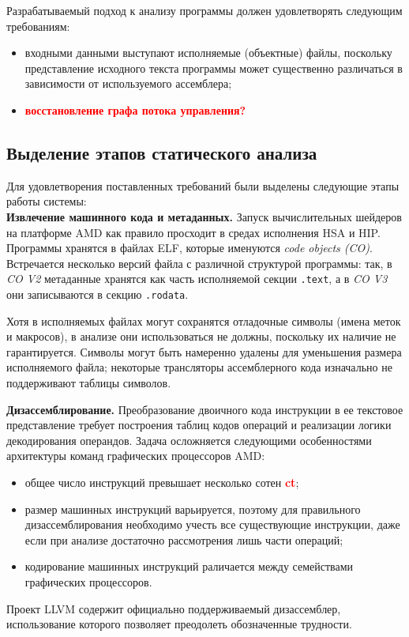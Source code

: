 \documentclass[a4paper,14pt]{extarticle}
\newcommand{\todo}[1]{\textbf{\textcolor{red}{#1}}}
\newcommand{\topic}[2]{\textbf{#1.} #2\newline}
\newenvironment{ul}{\begin{itemize}[noitemsep,topsep=0em]}{\end{itemize}\vspace{4mm}}
\begin{document}
Разрабатываемый подход к анализу программы должен удовлетворять следующим требованиям:

\begin{ul}
\item входными данными выступают исполняемые (объектные) файлы, поскольку представление исходного текста программы может существенно различаться в зависимости от используемого ассемблера;
\item \todo{восстановление графа потока управления?}
\end{ul}

\subsection{Выделение этапов статического анализа}

Для удовлетворения поставленных требований были выделены следующие этапы работы системы:\\

\topic{Извлечение машинного кода и метаданных}{Запуск вычислительных шейдеров на платформе AMD
как правило просходит в средах исполнения HSA и HIP. Программы хранятся в файлах ELF,
которые именуются \textit{code objects (CO)}.
Встречается несколько версий файла с различной структурой программы: так,
в \textit{CO V2} метаданные хранятся как часть исполняемой секции \texttt{.text}, а
в \textit{CO V3} они записываются в секцию \texttt{.rodata}.

Хотя в исполняемых файлах могут сохранятся отладочные символы
(имена меток и макросов), в анализе они использоваться не должны, поскольку их наличие не гарантируется.
Символы могут быть намеренно удалены для уменьшения размера исполняемого файла;
некоторые трансляторы ассемблерного кода изначально не поддерживают таблицы символов.}

\topic{Дизассемблирование}{Преобразование двоичного кода инструкции в ее текстовое представление
требует построения таблиц кодов операций и реализации логики декодирования операндов.
Задача осложняется следующими особенностями архитектуры команд графических процессоров AMD:
\begin{ul}
\item общее число инструкций превышает несколько сотен \todo{ct};
\item размер машинных инструкций варьируется, поэтому для правильного дизассемблирования необходимо
  учесть все существующие инструкции, даже если при анализе достаточно рассмотрения лишь части операций;
\item кодирование машинных инструкций раличается между семействами графических процессоров.
\end{ul}

Проект LLVM содержит официально поддерживаемый дизассемблер, использование которого позволяет
преодолеть обозначенные трудности.
}
\end{document}
